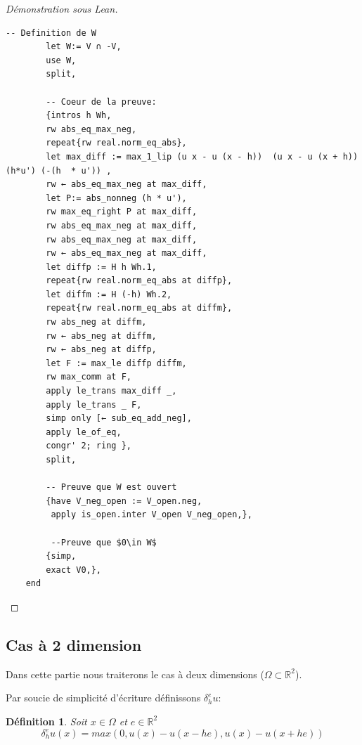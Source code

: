 \documentclass[12pt]{article}
\def\bR{\mathbb{R}}
\newtheorem{definition}[theorem]{D\'efinition}
\numberwithin{equation}{section}
\begin{document}
\begin{proof}[Démonstration sous Lean]
\begin{lstlisting}[gobble=2]
        -- Definition de W
        let W:= V ∩ -V,
        use W,
        split,

        -- Coeur de la preuve:
        {intros h Wh,
        rw abs_eq_max_neg,
        repeat{rw real.norm_eq_abs},
        let max_diff := max_1_lip (u x - u (x - h))  (u x - u (x + h)) (h*u') (-(h  * u')) ,
        rw ← abs_eq_max_neg at max_diff,
        let P:= abs_nonneg (h * u'),
        rw max_eq_right P at max_diff,
        rw abs_eq_max_neg at max_diff,
        rw abs_eq_max_neg at max_diff,
        rw ← abs_eq_max_neg at max_diff,
        let diffp := H h Wh.1,
        repeat{rw real.norm_eq_abs at diffp},
        let diffm := H (-h) Wh.2,
        repeat{rw real.norm_eq_abs at diffm},
        rw abs_neg at diffm,
        rw ← abs_neg at diffm,
        rw ← abs_neg at diffp,
        let F := max_le diffp diffm,
        rw max_comm at F,
        apply le_trans max_diff _,
        apply le_trans _ F,
        simp only [← sub_eq_add_neg],
        apply le_of_eq,
        congr' 2; ring },
        split,

        -- Preuve que W est ouvert
        {have V_neg_open := V_open.neg,
         apply is_open.inter V_open V_neg_open,},

         --Preuve que $0\in W$
        {simp,
        exact V0,},
    end
\end{lstlisting}
\end{proof}




\subsection{Cas à 2 dimension}


Dans cette partie nous traiterons le cas à deux dimensions ($\Omega\subset \bR^2$).

Par soucie de simplicité d'écriture définissons $\delta^e_hu$:
\begin{definition}
Soit $x\in \Omega$ et $e\in \bR^2$
\begin{equation}
    \delta^e_hu(x)=max(0,u(x)-u(x-he),u(x)-u(x+he))
\end{equation}
\end{definition}


\end{document}
